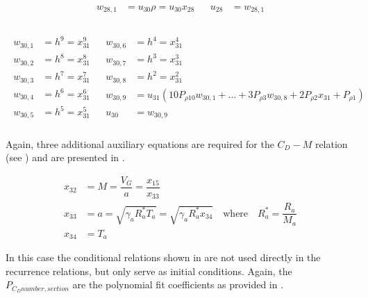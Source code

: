 \begin{align} \label{eq:u28}
\begin{split}
w_{28,1} &= u_{30}\rho = u_{30}x_{28} \\
\end{split}
&
\begin{split}
u_{28} &= w_{28,1} \\
\end{split}
\end{align}

\begin{align} \label{eq:u30}
\begin{split}
w_{30,1} &= h^{9} = x_{31}^9 \\
w_{30,2} &= h^{8} = x_{31}^8 \\
w_{30,3} &= h^{7} = x_{31}^7 \\
w_{30,4} &= h^{6} = x_{31}^6 \\
w_{30,5} &= h^{5} = x_{31}^5 \\
\end{split}
&
\begin{split}
w_{30,6} &= h^{4} = x_{31}^4 \\
w_{30,7} &= h^{3} = x_{31}^3 \\
w_{30,8} &= h^{2} = x_{31}^2 \\
w_{30,9} &= u_{31}\left(10P_{\rho 10}w_{30,1}+\dots +3P_{\rho 3}w_{30,8} + 2P_{\rho 2}x_{31}+P_{\rho 1}\right) \\
\\
u_{30} &= w_{30,9} \\
\end{split}
\end{align}

\noindent
Again, three additional auxiliary equations are required for the $C_{D}-M$ relation (see ) and are presented in .

 \begin{equation} \label{eq:cdAux}
\begin{split}
x_{32} &= M = \dfrac{V_{G}}{a} = \dfrac{x_{15}}{x_{33}}\\
x_{33} &= a = \sqrt{\gamma_{a}R_{a}^{*}T_{a}} = \sqrt{\gamma_{a}R_{a}^{*}x_{34}} \quad \text{where} \quad R_{a}^{*}=\dfrac{R_{a}}{M_{a}} \\
x_{34} &= T_{a}
\end{split}
\end{equation}

\noindent
In this case the conditional relations shown in  are not used directly in the recurrence relations, but only serve as initial conditions. Again, the $P_{C_{D} number,section}$ are the polynomial fit coefficients as provided in .

